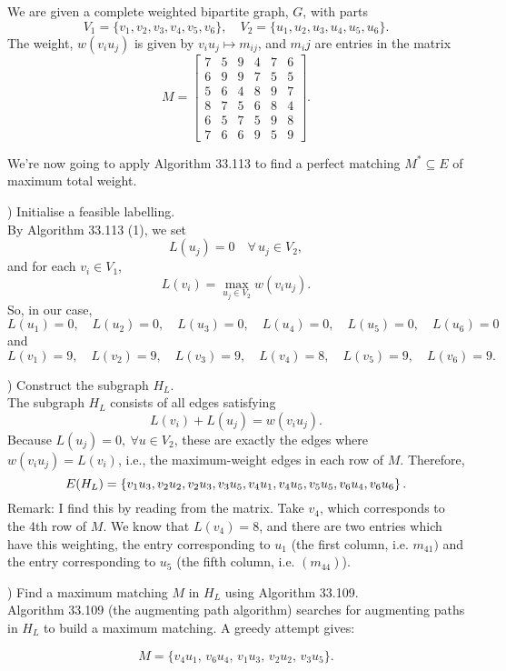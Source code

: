 \documentclass[a4paper,11pt]{report}
\begin{document}
We are given a complete weighted bipartite graph, $G$, with parts
\[
  V_1 = \{ v_1, v_2, v_3, v_4, v_5, v_6 \}, \quad
  V_2 = \{ u_1, u_2, u_3, u_4, u_5, u_6 \}.
\]
The weight, $w(v_iu_j)$ is given by $v_iu_j\mapsto m_{ij}$, and $m_ij$ are entries in the matrix
\[
  M =
  \begin{bmatrix}
    7 & 5 & 9 & 4 & 7 & 6 \\
    6 & 9 & 9 & 7 & 5 & 5 \\
    5 & 6 & 4 & 8 & 9 & 7 \\
    8 & 7 & 5 & 6 & 8 & 4 \\
    6 & 5 & 7 & 5 & 9 & 8 \\
    7 & 6 & 6 & 9 & 5 & 9
  \end{bmatrix}.
\]

We're now going to apply Algorithm 33.113 to find a perfect matching \( M^* \subseteq E \) of maximum total weight.

) Initialise a feasible labelling.\\
By Algorithm 33.113 (1), we set
\[
  L(u_j) = 0 \quad \forall\, u_j \in V_2,
\]
and for each \( v_i \in V_1 \),
\[
  L(v_i) = \max_{u_j \in V_2} w(v_i u_j).
\]
So, in our case,
\[
  L(u_1)=0,\quad L(u_2)=0,\quad L(u_3)=0,\quad L(u_4)=0,\quad L(u_5)=0,\quad L(u_6)=0
\]
and
\[
  L(v_1)=9,\quad L(v_2)=9,\quad L(v_3)=9,\quad L(v_4)=8,\quad L(v_5)=9,\quad L(v_6)=9.
\]

) Construct the subgraph \( H_L \).\\
The subgraph \( H_L \) consists of all edges satisfying
\[
L(v_i) + L(u_j) = w(v_i u_j).
\]
Because \( L(u_j)=0,\ \forall u\in V_2  \), these are exactly the edges where \( w(v_i u_j) = L(v_i) \), i.e., the maximum-weight edges in each row of \( M \). Therefore, 
\[
  E(H_L) = \left\lbrace  v_1u_3,  v_2u_2, v_2u_3,  v_3u_5,  v_4u_1, v_4u_5,  v_5u_5,  v_6u_4, v_6u_6   \right\rbrace.
\]
Remark: I find this by reading from the matrix. Take $v_4$, which corresponds to the 4th row of $M$. We know that $L(v_4)=8$, and there are two entries which have this weighting, the entry corresponding to $u_1$ (the first column, i.e. $m_{41})$ and the entry corresponding to $u_5$ (the fifth column, i.e. $(m_{44})$).

) Find a maximum matching \( M \) in \( H_L \) using Algorithm 33.109.\\
Algorithm 33.109 (the augmenting path algorithm) searches for augmenting paths in \( H_L \) to build a maximum matching. A greedy attempt gives:

\[
  M = \{ v_4u_1,\, v_6u_4,\, v_1u_3,\, v_2u_2,\, v_3u_5 \}.
\]
\end{document}
